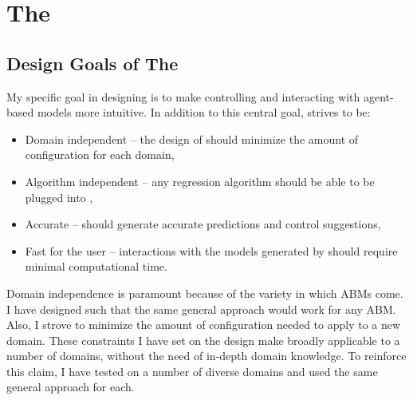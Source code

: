 \chapter{The \FRAMEWORK}
\thispagestyle{plain}

\label{Framework}


\section{Design Goals of The \framework}

My specific goal in designing \fw is to make controlling and interacting with agent-based models more intuitive.
In addition to this central goal, \fw strives to be:
\begin{itemize}
  \item Domain independent -- the design of \fw should minimize the amount of configuration for each domain,
  \item Algorithm independent -- any regression algorithm should be able to be plugged into \fw,
  \item Accurate -- \fw should generate accurate predictions and control suggestions,
  \item Fast for the user -- interactions with the models generated by \fw should require minimal computational time.
\end{itemize}

Domain independence is paramount because of the variety in which ABMs come.
I have designed \fw such that the same general approach would work for any ABM.
Also, I strove to minimize the amount of configuration needed to apply \fw to a new domain.
These constraints I have set on the design make \fw broadly applicable to a number of domains, without the need of in-depth domain knowledge.
To reinforce this claim, I have tested \fw on a number of diverse domains and used the same general approach for each.

